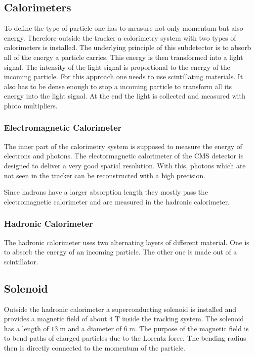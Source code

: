 \subsection{Calorimeters}
	To define the type of particle one has to measure not only momentum but also energy. Therefore outside the tracker a colorimetry system with two types of calorimeters is installed. The underlying principle of this subdetector is to absorb all of the energy a particle carries. This energy is then transformed into a light signal. The intensity of the light signal is proportional to the energy of the incoming particle. For this approach one needs to use scintillating materials. It also has to be dense enough to stop a incoming particle to transform all its energy into the light signal. At the end the light is collected and measured with photo multipliers.
\subsubsection{Electromagnetic Calorimeter}
	The inner part of the calorimetry system is supposed to measure the energy of electrons and photons. The electormagnetic calorimeter of the CMS detector is designed to deliver a very good spatial resolution. With this, photons which are not seen in the tracker can be reconstructed with a high precision.
	
	Since hadrons have a larger absorption length they mostly pass the electromagnetic calorimeter and are measured in the hadronic calorimeter.
\subsubsection{Hadronic Calorimeter}
	The hadronic calorimeter uses two alternating layers of different material. One is to absorb the energy of an incoming particle. The other one is made out of a scintillator.
	
\subsection{Solenoid}
	Outside the hadronic calorimeter a superconducting solenoid is installed and provides a magnetic field of about $4\;\text{T}$ inside the tracking system. The solenoid has a length of $13\;\text{m}$ and a diameter of $6\;\text{m}$. The purpose of the magnetic field is to bend paths of charged particles due to the Lorentz force. The bending radius then is directly connected to the momentum of the particle.  
